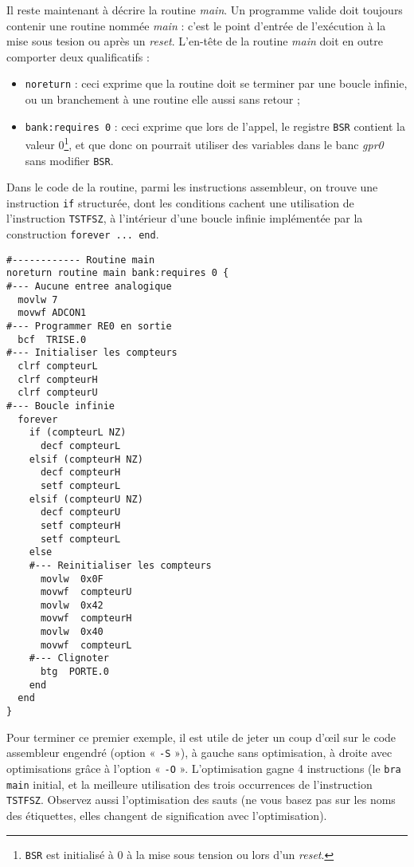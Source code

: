 Il reste maintenant à décrire la routine \emph{main}. Un programme valide doit toujours contenir une routine nommée \emph{main} : c'est le point d'entrée de l'exécution à la mise sous tesion ou après un \emph{reset}. L'en-tête de la routine \emph{main} doit en outre comporter deux qualificatifs :
\begin{itemize}
  \item \texttt{noreturn} : ceci exprime que la routine doit se terminer par une boucle infinie, ou un branchement à une routine elle aussi sans retour ;
  \item \texttt{bank:requires 0} : ceci exprime que lors de l'appel, le registre \texttt{BSR} contient la valeur 0\footnote{\texttt{BSR} est initialisé à 0 à la mise sous tension ou lors d'un \emph{reset}.}, et que donc on pourrait utiliser des variables dans le banc \emph{gpr0} sans modifier \texttt{BSR}.
\end{itemize}

Dans le code de la routine, parmi les instructions assembleur, on trouve une instruction \texttt{if} structurée, dont les conditions cachent une utilisation de l’instruction \texttt{TSTFSZ}, à l'intérieur d'une boucle infinie implémentée par la construction \texttt{forever ... end}.

\begin{lstlisting}[language=piccolo]
#------------ Routine main
noreturn routine main bank:requires 0 {
#--- Aucune entree analogique
  movlw 7
  movwf ADCON1
#--- Programmer RE0 en sortie
  bcf  TRISE.0
#--- Initialiser les compteurs
  clrf compteurL
  clrf compteurH
  clrf compteurU
#--- Boucle infinie
  forever
    if (compteurL NZ)
      decf compteurL
    elsif (compteurH NZ)
      decf compteurH
      setf compteurL
    elsif (compteurU NZ)
      decf compteurU
      setf compteurH
      setf compteurL
    else
    #--- Reinitialiser les compteurs
      movlw  0x0F
      movwf  compteurU
      movlw  0x42
      movwf  compteurH
      movlw  0x40
      movwf  compteurL
    #--- Clignoter
      btg  PORTE.0
    end
  end
}
\end{lstlisting}

Pour terminer ce premier exemple, il est utile de jeter un coup d’œil sur le code assembleur engendré (option « \texttt{-S} »), à gauche sans optimisation, à droite avec optimisations grâce à l’option « \texttt{-O} ». L’optimisation gagne 4 instructions (le \texttt{bra main} initial, et la meilleure utilisation des trois occurrences de l’instruction \texttt{TSTFSZ}. Observez aussi l’optimisation des sauts (ne vous basez pas sur les noms des étiquettes, elles changent de signification avec l’optimisation).

